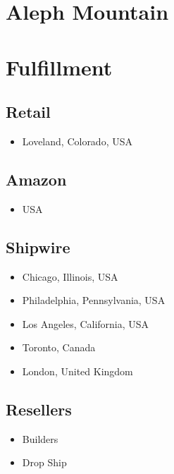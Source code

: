 %
%
%
%
%

\section{Aleph Mountain}

\section{Fulfillment}
\subsection{Retail}
\begin{itemize}
\item Loveland, Colorado, USA
\end{itemize}

\subsection{Amazon}
\begin{itemize}
\item USA
\end{itemize}

\subsection{Shipwire}
\begin{itemize}
\item Chicago, Illinois, USA
\item Philadelphia, Pennsylvania, USA
\item Los Angeles, California, USA
\item Toronto, Canada
\item London, United Kingdom
\end{itemize}

\subsection{Resellers}
\begin{itemize}
\item Builders
\item Drop Ship
\end{itemize}

